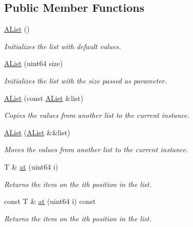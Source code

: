 \subsection*{Public Member Functions}
\begin{DoxyCompactItemize}
\item 
\mbox{\label{class_a_list_a0a4bc6509f21976058b3bd0b4fbc5d31}} 
\mbox{\hyperlink{class_a_list_a0a4bc6509f21976058b3bd0b4fbc5d31}{A\+List}} ()
\begin{DoxyCompactList}\small\item\em Initializes the list with default values. \end{DoxyCompactList}\item 
\mbox{\hyperlink{class_a_list_ab1d008b3fd27e2925f4b386ac2a40ebb}{A\+List}} (uint64 size)
\begin{DoxyCompactList}\small\item\em Initializes the list with the size passed as parameter. \end{DoxyCompactList}\item 
\mbox{\hyperlink{class_a_list_a6009559ea4861f2a9263e447485dfeb2}{A\+List}} (const \mbox{\hyperlink{class_a_list}{A\+List}} \&list)
\begin{DoxyCompactList}\small\item\em Copies the values from another list to the current instance. \end{DoxyCompactList}\item 
\mbox{\hyperlink{class_a_list_a0e4ad9eb6d7cbb883a56f67589c65be9}{A\+List}} (\mbox{\hyperlink{class_a_list}{A\+List}} \&\&list)
\begin{DoxyCompactList}\small\item\em Moves the values from another list to the current instance. \end{DoxyCompactList}\item 
T \& \mbox{\hyperlink{class_a_list_a3d5b7d06f274500c8b6fd3023b901b8b}{at}} (uint64 i)
\begin{DoxyCompactList}\small\item\em Returns the item on the ith position in the list. \end{DoxyCompactList}\item 
const T \& \mbox{\hyperlink{class_a_list_a9ad261a0e55e749c88921de518b1a6d1}{at}} (uint64 i) const
\begin{DoxyCompactList}\small\item\em Returns the item on the ith position in the list. \end{DoxyCompactList}\item 

\end{DoxyCompactItemize}
